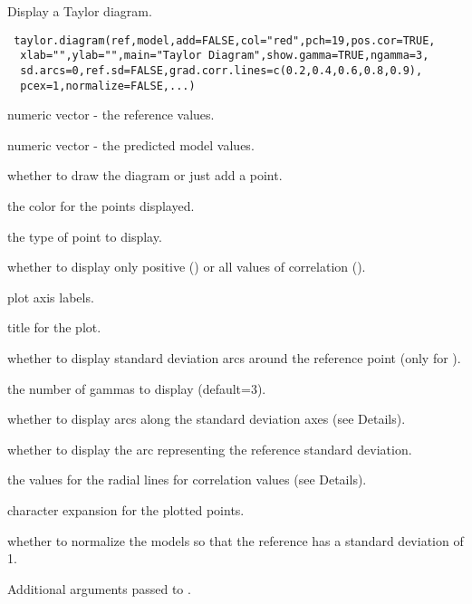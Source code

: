 \begin{Description}\relax
Display a Taylor diagram.
\end{Description}
\begin{Usage}
\begin{verbatim}
 taylor.diagram(ref,model,add=FALSE,col="red",pch=19,pos.cor=TRUE,
  xlab="",ylab="",main="Taylor Diagram",show.gamma=TRUE,ngamma=3,
  sd.arcs=0,ref.sd=FALSE,grad.corr.lines=c(0.2,0.4,0.6,0.8,0.9),
  pcex=1,normalize=FALSE,...)
\end{verbatim}
\end{Usage}
\begin{Arguments}
\begin{ldescription}
\item[\code{ref}] numeric vector - the reference values.
\item[\code{model}] numeric vector - the predicted model values.
\item[\code{add}] whether to draw the diagram or just add a point.
\item[\code{col}] the color for the points displayed.
\item[\code{pch}] the type of point to display.
\item[\code{pos.cor}] whether to display only positive () or all
values of correlation ().
\item[\code{xlab,ylab}] plot axis labels.
\item[\code{main}] title for the plot.
\item[\code{show.gamma}] whether to display standard deviation arcs around
the reference point (only for ).
\item[\code{ngamma}] the number of gammas to display (default=3).
\item[\code{sd.arcs}] whether to display arcs along the standard deviation axes
(see Details).
\item[\code{ref.sd}] whether to display the arc representing the reference
standard deviation.
\item[\code{grad.corr.lines}] the values for the radial lines for correlation
values (see Details).
\item[\code{pcex}] character expansion for the plotted points.
\item[\code{normalize}] whether to normalize the models so that the reference
has a standard deviation of 1.
\item[\code{...}] Additional arguments passed to .
\end{ldescription}
\end{Arguments}

